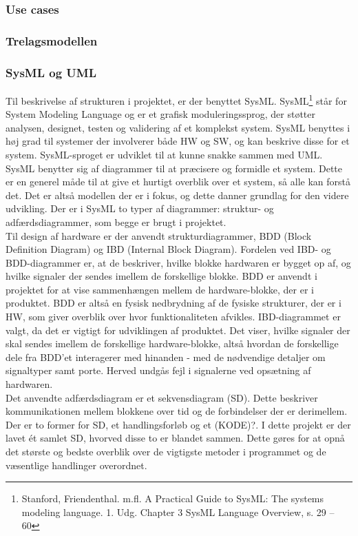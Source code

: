 \subsubsection{Use cases}
\subsubsection{Trelagsmodellen}
\subsubsection{SysML og UML}

Til beskrivelse af strukturen i projektet, er der benyttet SysML. 
SysML\footnote{Stanford, Friendenthal. m.fl. A Practical Guide to SysML: The systems modeling language. 1. Udg. Chapter 3 SysML Language Overview, s. 29 – 60} står for System Modeling Language og er et grafisk moduleringssprog, der støtter analysen, designet, testen og validering af et komplekst system. SysML benyttes i høj grad til systemer der involverer både HW og SW, og kan beskrive disse for et system. SysML-sproget er udviklet til at kunne snakke sammen med UML. 
SysML benytter sig af diagrammer til at præcisere og formidle et system. Dette er en generel måde til at give et hurtigt overblik over et system, så alle kan forstå det. Det er altså modellen der er i fokus, og dette danner grundlag for den videre udvikling. Der er i SysML to typer af diagrammer: struktur- og adfærdsdiagrammer, som begge er brugt i projektet.\\
\newline
Til design af hardware er der anvendt strukturdiagrammer, BDD (Block Definition Diagram) og IBD (Internal Block Diagram). Fordelen ved IBD- og BDD-diagrammer er, at de beskriver, hvilke blokke hardwaren er bygget op af, og hvilke signaler der sendes imellem de forskellige blokke. BDD er anvendt i projektet for at vise sammenhængen mellem de hardware-blokke, der er i produktet. BDD er altså en fysisk nedbrydning af de fysiske strukturer, der er i HW, som giver overblik over hvor funktionaliteten afvikles. IBD-diagrammet er valgt, da det er vigtigt for udviklingen af produktet. Det viser, hvilke signaler der skal sendes imellem de forskellige hardware-blokke, altså hvordan de forskellige dele fra BDD'et interagerer med hinanden - med de nødvendige detaljer om signaltyper samt porte. Herved undgås fejl i signalerne ved opsætning af hardwaren.\\
\newline
Det anvendte adfærdsdiagram er et sekvensdiagram (SD). Dette beskriver kommunikationen mellem blokkene over tid og de forbindelser der er derimellem. Der er to former for SD, et handlingsforløb og et (KODE)?. I dette projekt er der lavet ét samlet SD, hvorved disse to er blandet sammen. Dette gøres for at opnå det største og bedste overblik over de vigtigste metoder i programmet og de væsentlige handlinger overordnet. \\
